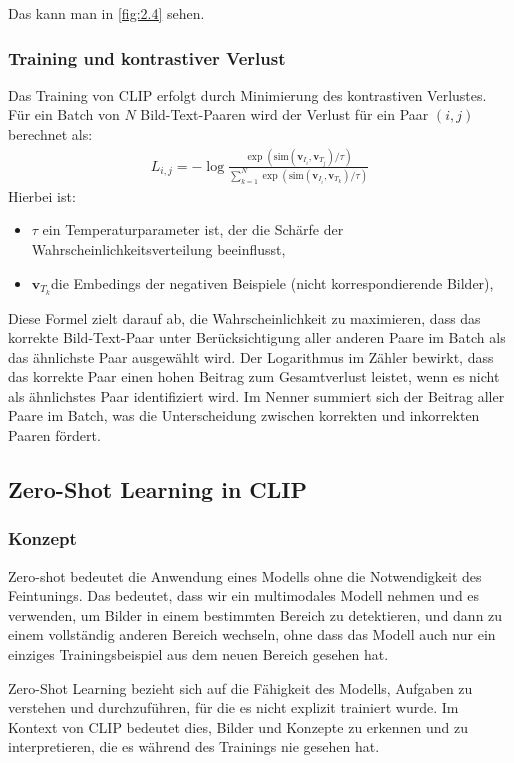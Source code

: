 \documentclass[nolibertine, ngerman, algorithm, nomencl, minted]{ttlab-qualify}
\begin{document}
Das kann man in \ref{fig:2.4} sehen.
\subsubsection{Training und kontrastiver Verlust}
Das Training von CLIP erfolgt durch Minimierung des kontrastiven Verlustes. Für ein Batch von \( N \) Bild-Text-Paaren wird der Verlust für ein Paar \( (i, j) \) berechnet als:
\begin{align*}
L_{i,j} = -\log \frac{\exp(\text{sim}(\textbf{v}_{I_i}, \textbf{v}_{T_j}) / \tau)}{\sum_{k=1}^{N} \exp(\text{sim}(\textbf{v}_{I_i}, \textbf{v}_{T_k}) / \tau)}
\end{align*}
Hierbei ist:
\begin{itemize}
 \item \( \tau \) ein Temperaturparameter ist, der die Schärfe der Wahrscheinlichkeitsverteilung beeinflusst,
 \item \(\textbf{v}_{T_k}\)die Embedings der negativen Beispiele (nicht korrespondierende Bilder),
\end{itemize}

Diese Formel zielt darauf ab, die Wahrscheinlichkeit zu maximieren, dass das korrekte Bild-Text-Paar unter 
Berücksichtigung aller anderen Paare im Batch als das ähnlichste Paar ausgewählt wird. Der Logarithmus im 
Zähler bewirkt, dass das korrekte Paar einen hohen Beitrag zum Gesamtverlust leistet, wenn es nicht als ähnlichstes 
Paar identifiziert wird. Im Nenner summiert sich der Beitrag aller Paare im Batch, was die Unterscheidung zwischen 
korrekten und inkorrekten Paaren fördert.

\subsection{Zero-Shot Learning in CLIP}
\subsubsection{Konzept}
Zero-shot bedeutet die Anwendung eines Modells ohne die Notwendigkeit des Feintunings. 
Das bedeutet, dass wir ein multimodales Modell nehmen und es verwenden, um Bilder in einem 
bestimmten Bereich zu detektieren, und dann zu einem vollständig anderen Bereich wechseln, 
ohne dass das Modell auch nur ein einziges Trainingsbeispiel aus dem neuen Bereich gesehen hat.

Zero-Shot Learning bezieht sich auf die Fähigkeit des Modells,
Aufgaben zu verstehen und durchzuführen, für die es nicht 
explizit trainiert wurde. Im Kontext von CLIP bedeutet dies, 
Bilder und Konzepte zu erkennen und zu interpretieren, 
die es während des Trainings nie gesehen hat.
\end{document}
